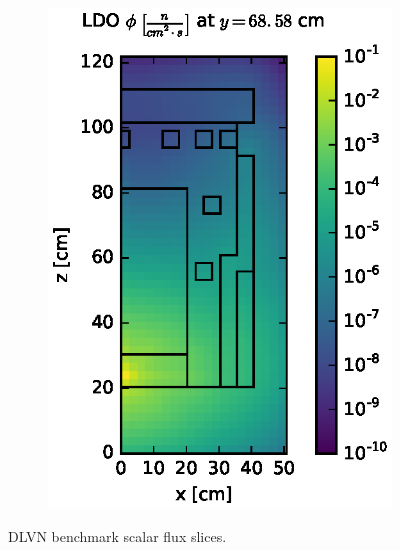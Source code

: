 \documentclass{article} %
\begin{document}
\begin{figure}[!htb]
\begin{subfigure}{0.4\textwidth}
\includegraphics[max height=0.445\textheight]
{dlvn-fwd-flux-ldo11.eps}
\end{subfigure}
\caption{DLVN benchmark scalar flux slices.}
\label{dlvn-fwd-slices}
\end{figure}
\end{document}
